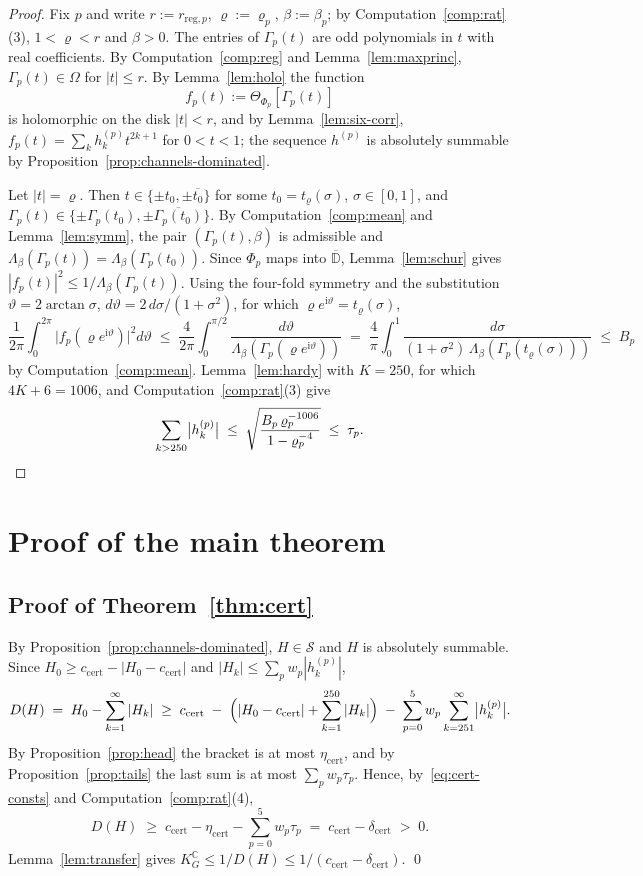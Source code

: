 \documentclass[11pt,reqno]{amsart}
\theoremstyle{definition}
\numberwithin{equation}{section}
\newcommand{\C}{\mathbb{C}}
\newcommand{\D}{\mathbb{D}}
\newcommand{\KGC}{K_G^{\C}}
\newcommand{\ii}{\mathrm{i}}
\newcommand{\Scl}{\mathcal{S}}
\newcommand{\Om}{\Omega}
\newcommand{\ccert}{c_{\mathrm{cert}}}
\newcommand{\dcert}{\delta_{\mathrm{cert}}}
\begin{document}
\begin{proof}
Fix $p$ and write $r:=r_{\mathrm{reg},p}$, $\varrho:=\varrho_p$, $\beta:=\beta_p$; by Computation~\ref{comp:rat}(3), $1<\varrho<r$ and $\beta>0$. The entries of $\Gamma_p(t)$ are odd polynomials in $t$ with real coefficients. By Computation~\ref{comp:reg} and Lemma~\ref{lem:maxprinc}, $\Gamma_p(t)\in\Om$ for $|t|\le r$. By Lemma~\ref{lem:holo} the function
\[
  f_p(t):=\Theta_{\Phi_p}[\Gamma_p(t)]
\]
is holomorphic on the disk $|t|<r$, and by Lemma~\ref{lem:six-corr}, $f_p(t)=\sum_kh^{(p)}_kt^{2k+1}$ for $0<t<1$; the sequence $h^{(p)}$ is absolutely summable by Proposition~\ref{prop:channels-dominated}.

Let $|t|=\varrho$. Then $t\in\{\pm t_0,\pm\overline{t_0}\}$ for some $t_0=t_\varrho(\sigma)$, $\sigma\in[0,1]$, and $\Gamma_p(t)\in\{\pm\Gamma_p(t_0),\pm\overline{\Gamma_p(t_0)}\}$. By Computation~\ref{comp:mean} and Lemma~\ref{lem:symm}, the pair $(\Gamma_p(t),\beta)$ is admissible and $\Lambda_\beta(\Gamma_p(t))=\Lambda_\beta(\Gamma_p(t_0))$. Since $\Phi_p$ maps into $\overline{\D}$, Lemma~\ref{lem:schur} gives $|f_p(t)|^2\le1/\Lambda_\beta(\Gamma_p(t))$. Using the four-fold symmetry and the substitution $\vartheta=2\arctan\sigma$, $d\vartheta=2\,d\sigma/(1+\sigma^2)$, for which $\varrho e^{\ii\vartheta}=t_\varrho(\sigma)$,
\[
  \frac1{2\pi}\int_0^{2\pi}\bigl|f_p(\varrho e^{\ii\vartheta})\bigr|^2d\vartheta
  \;\le\;\frac4{2\pi}\int_0^{\pi/2}\frac{d\vartheta}{\Lambda_\beta(\Gamma_p(\varrho e^{\ii\vartheta}))}
  \;=\;\frac4\pi\int_0^1\frac{d\sigma}{(1+\sigma^2)\,\Lambda_\beta(\Gamma_p(t_\varrho(\sigma)))}\;\le\;B_p
\]
by Computation~\ref{comp:mean}. Lemma~\ref{lem:hardy} with $K=250$, for which $4K+6=1006$, and Computation~\ref{comp:rat}(3) give
\[
  \sum_{k>250}\bigl|h^{(p)}_k\bigr|\;\le\;\sqrt{\frac{B_p\,\varrho_p^{-1006}}{1-\varrho_p^{-4}}}\;\le\;\tau_p . \qedhere
\]
\end{proof}

\section{Proof of the main theorem}\label{sec:proof}

\subsection{Proof of Theorem~\ref{thm:cert}}
By Proposition~\ref{prop:channels-dominated}, $H\in\Scl$ and $H$ is absolutely summable. Since $H_0\ge\ccert-|H_0-\ccert|$ and $|H_k|\le\sum_pw_p|h^{(p)}_k|$,
\begin{equation}\label{eq:budget-split}
  D(H) \;=\; H_0 - \sum_{k=1}^\infty |H_k|
  \;\ge\; \ccert \;-\; \Bigl(|H_0 - \ccert| + \sum_{k=1}^{250} |H_k|\Bigr)
  \;-\; \sum_{p=0}^5 w_p \sum_{k=251}^\infty \bigl|h_k^{(p)}\bigr| .
\end{equation}
By Proposition~\ref{prop:head} the bracket is at most $\eta_{\mathrm{cert}}$, and by Proposition~\ref{prop:tails} the last sum is at most $\sum_pw_p\tau_p$. Hence, by~\eqref{eq:cert-consts} and Computation~\ref{comp:rat}(4),
\[
  D(H)\;\ge\;\ccert-\eta_{\mathrm{cert}}-\sum_{p=0}^5w_p\tau_p\;=\;\ccert-\dcert\;>\;0 .
\]
Lemma~\ref{lem:transfer} gives $\KGC\le1/D(H)\le1/(\ccert-\dcert)$. \qed
\end{document}
